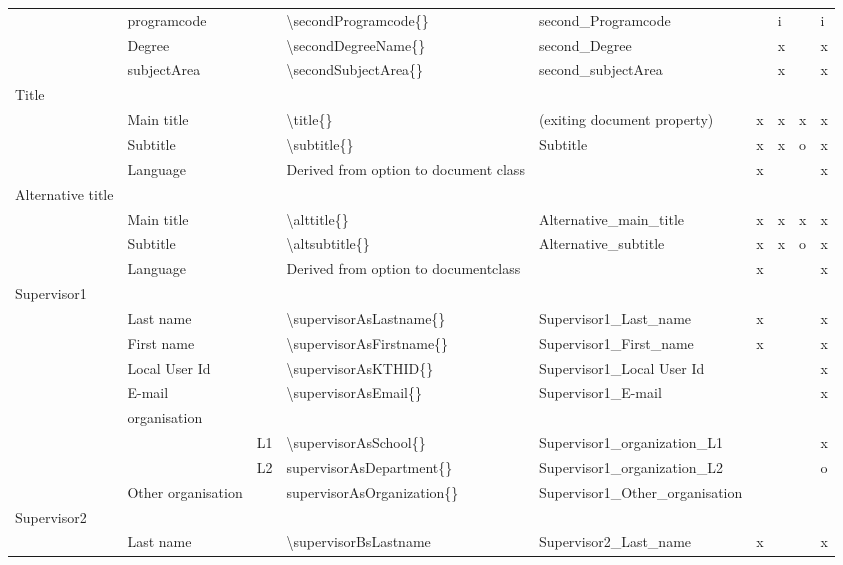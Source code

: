 \documentclass[12pt, twoside]{article}
\begin{document}
\begin{landscape}
{\begin{longtable}{L{2cm}|L{4cm}|l|L{4cm}|L{4cm}|l l l l|}
& programcode &  & \textbackslash secondProgramcode\{\} & second\_Programcode &  & i &  & i \\
& Degree &  & \textbackslash secondDegreeName\{\} & second\_Degree &  & x &  & x \\
& subjectArea &  & \textbackslash secondSubjectArea\{\} & second\_subjectArea &  & x &  & x \\
       \hline
Title & \\
 & Main title &  & \textbackslash title\{\} & (exiting document property) & x & x & x & x \\
 & Subtitle &  & \textbackslash subtitle\{\} & Subtitle & x & x & o & x \\
 & Language &  & Derived from option to document class &  & x &  &  & x \\
Alternative title & \\
 & Main title &  & \textbackslash alttitle\{\} & Alternative\_main\_title & x & x & x & x \\
 & Subtitle &  & \textbackslash altsubtitle\{\} & Alternative\_subtitle & x & x & o & x \\
 & Language &  & Derived from option to documentclass &  & x &  &  & x \\
      \hline
Supervisor1 & \\
 & Last name &  & \textbackslash supervisorAsLastname\{\} & Supervisor1\_Last\_name & x &  &  & x \\
 & First name &  & \textbackslash supervisorAsFirstname\{\} & Supervisor1\_First\_name & x &  &  & x \\
 & Local User Id &  & \textbackslash supervisorAsKTHID\{\} & Supervisor1\_Local User Id &  &  &  & x \\
 & E-mail &  & \textbackslash supervisorAsEmail\{\} & Supervisor1\_E-mail &  &  &  & x \\
 & organisation & \\
 &  & L1 & \textbackslash supervisorAsSchool\{\} & Supervisor1\_organization\_L1 &  &  &  & x \\
 &  & L2 & supervisorAsDepartment\{\} & Supervisor1\_organization\_L2 &  &  &  & o \\
 & Other organisation &  & supervisorAsOrganization\{\} & Supervisor1\_Other\_organisation &  &  &  &  \\
Supervisor2 &  \\
 & Last name &  & \textbackslash supervisorBsLastname{ } & Supervisor2\_Last\_name & x &  &  & x \\

\end{longtable}}
\end{landscape}
\end{document}
